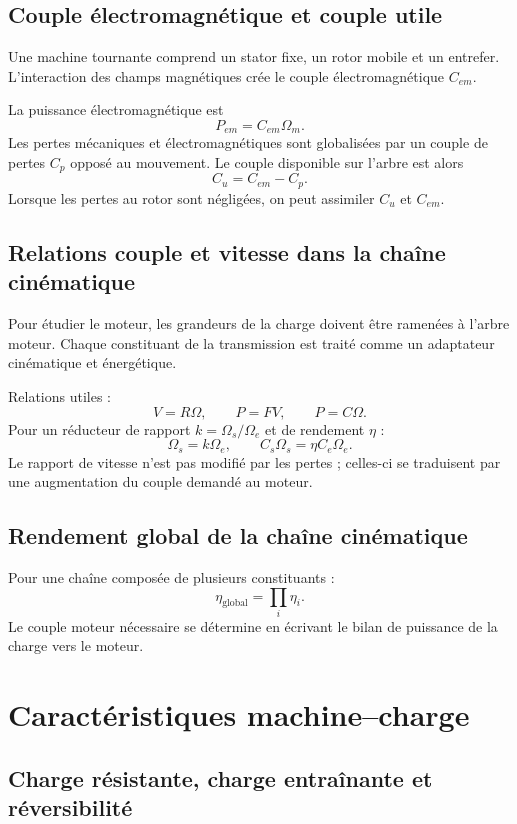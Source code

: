 \subsection{Couple électromagnétique et couple utile}

Une machine tournante comprend un stator fixe, un rotor mobile et un entrefer. L'interaction des champs magnétiques crée le couple électromagnétique $C_{em}$.

La puissance électromagnétique est
\[
P_{em}=C_{em}\Omega_m.
\]
Les pertes mécaniques et électromagnétiques sont globalisées par un couple de pertes $C_p$ opposé au mouvement. Le couple disponible sur l'arbre est alors
\[
C_u=C_{em}-C_p.
\]
Lorsque les pertes au rotor sont négligées, on peut assimiler $C_u$ et $C_{em}$.

\subsection{Relations couple et vitesse dans la chaîne cinématique}

Pour étudier le moteur, les grandeurs de la charge doivent être ramenées à l'arbre moteur. Chaque constituant de la transmission est traité comme un adaptateur cinématique et énergétique.

\TLChaineCinematique

Relations utiles :
\[
V=R\Omega,
\qquad
P=FV,
\qquad
P=C\Omega.
\]
Pour un réducteur de rapport $k=\Omega_s/\Omega_e$ et de rendement $\eta$ :
\[
\Omega_s=k\Omega_e,
\qquad
C_s\Omega_s=\eta C_e\Omega_e.
\]
Le rapport de vitesse n'est pas modifié par les pertes ; celles-ci se traduisent par une augmentation du couple demandé au moteur.

\subsection{Rendement global de la chaîne cinématique}

Pour une chaîne composée de plusieurs constituants :
\[
\eta_{\mathrm{global}}=\prod_i \eta_i.
\]
Le couple moteur nécessaire se détermine en écrivant le bilan de puissance de la charge vers le moteur.

\section{Caractéristiques machine--charge}\label{sec:em-machine-charge}

\subsection{Charge résistante, charge entraînante et réversibilité}

